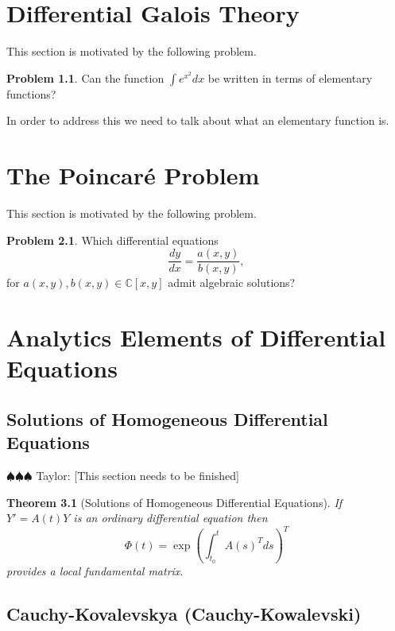 \documentclass[]{book}
\newcommand{\taylor}[1]{{\color{blue} \sf $\spadesuit\spadesuit\spadesuit$ Taylor: [#1]}}
\numberwithin{equation}{section}
\newtheorem{theorem}{Theorem}[subsection]
\theoremstyle{definition}
\newtheorem{problem}[theorem]{Problem}
\theoremstyle{remark}
\newcommand{\CC}{\mathbb{C}}
\begin{document}
\chapter[Differential Galois Theory]{Differential Galois Theory}

This section is motivated by the following problem.
\begin{problem}
	Can the function $\int e^{x^2} dx$ be written in terms of elementary functions?
\end{problem}
In order to address this we need to talk about what an elementary function is. 

\chapter[Poincar\'e Problem]{The Poincar\'e Problem}

This section is motivated by the following problem.
\begin{problem}
	Which differential equations 
	 $$ \dfrac{dy}{dx} = \frac{a(x,y)}{b(x,y)}, $$
	 for $a(x,y),b(x,y) \in \CC[x,y]$ admit algebraic solutions?
\end{problem}


\appendix 
\chapter[Analytic Elements]{Analytics Elements of Differential Equations}

\section{Solutions of Homogeneous Differential Equations}
\taylor{This section needs to be finished}

\begin{theorem}[Solutions of Homogeneous Differential Equations]
	If $Y'= A(t)Y$ is an ordinary differential equation then 
	 $$ \Phi(t) = \exp( \int_{t_0}^t A(s)^T ds )^T $$
	provides a local fundamental matrix. 
\end{theorem}



\section{Cauchy-Kovalevskya (Cauchy-Kowalevski)}

\backmatter





\end{document}
